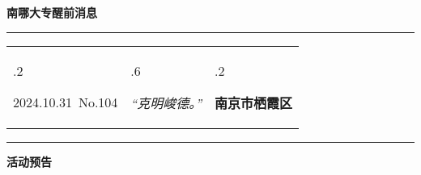 \documentclass[letterpaper, 12pt]{article}
\begin{document}
\begin{center}
    \Huge\textbf{南哪大专醒前消息}
\end{center}
\vspace{4mm}
\hrule
\renewcommand\tabularxcolumn[1]{m{#1}}
\begin{tabularx}{\textwidth}{>{\hsize.2\hsize}X>{\hsize.6\hsize}X>{\hsize.2\hsize}X}
    \begin{flushleft}
        2024.10.31\, No.104
    \end{flushleft}
    &
    \begin{center}
        \textit{“克明峻德。”}
    \end{center}
    &
    \begin{flushright}
        \textbf{南京市栖霞区}
    \end{flushright}
\end{tabularx}
\vspace{-3.5mm}
\hrule
\vspace{4mm}
\centerline{\huge\textbf{活动预告}}
\end{document}
